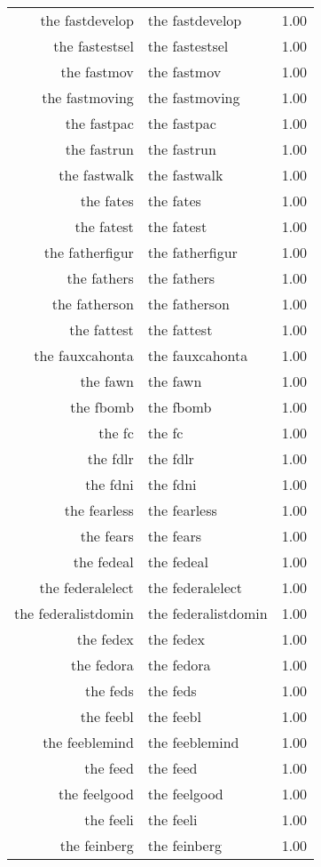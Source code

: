 \begin{table}[ht]
\begin{tabular}{rlr}
  the fastdevelop & the fastdevelop & 1.00 \\ 
  the fastestsel & the fastestsel & 1.00 \\ 
  the fastmov & the fastmov & 1.00 \\ 
  the fastmoving & the fastmoving & 1.00 \\ 
  the fastpac & the fastpac & 1.00 \\ 
  the fastrun & the fastrun & 1.00 \\ 
  the fastwalk & the fastwalk & 1.00 \\ 
  the fates & the fates & 1.00 \\ 
  the fatest & the fatest & 1.00 \\ 
  the fatherfigur & the fatherfigur & 1.00 \\ 
  the fathers & the fathers & 1.00 \\ 
  the fatherson & the fatherson & 1.00 \\ 
  the fattest & the fattest & 1.00 \\ 
  the fauxcahonta & the fauxcahonta & 1.00 \\ 
  the fawn & the fawn & 1.00 \\ 
  the fbomb & the fbomb & 1.00 \\ 
  the fc & the fc & 1.00 \\ 
  the fdlr & the fdlr & 1.00 \\ 
  the fdni & the fdni & 1.00 \\ 
  the fearless & the fearless & 1.00 \\ 
  the fears & the fears & 1.00 \\ 
  the fedeal & the fedeal & 1.00 \\ 
  the federalelect & the federalelect & 1.00 \\ 
  the federalistdomin & the federalistdomin & 1.00 \\ 
  the fedex & the fedex & 1.00 \\ 
  the fedora & the fedora & 1.00 \\ 
  the feds & the feds & 1.00 \\ 
  the feebl & the feebl & 1.00 \\ 
  the feeblemind & the feeblemind & 1.00 \\ 
  the feed & the feed & 1.00 \\ 
  the feelgood & the feelgood & 1.00 \\ 
  the feeli & the feeli & 1.00 \\ 
  the feinberg & the feinberg & 1.00 \\ 

\end{tabular}
\end{table}
